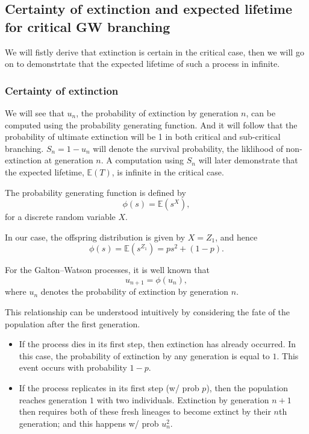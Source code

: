 \documentclass[11pt]{article}
\begin{document}
\subsection{Certainty of extinction and expected lifetime for critical GW branching}

We will fistly derive that extinction is certain in the critical case, then we will go on to demonstrtate that the
expected lifetime of such a process in infinite. 







\subsubsection{Certainty of extinction}


We will see that $u_n$, the probability of extinction by generation $n$, can be computed
using the probability generating function. And it will follow that the probability of ultimate 
extinction will be 1 in both critical and sub-critical branching. $S_n = 1-u_n$ will denote the survival probability,
the liklihood of non-extinction at generation $n$. A computation using $S_n$ will later demonstrate that the expected lifetime, $\mathbb{E}(T)$, is infinite in the critical case.

\vspace{12pt}


\noindent
The probability generating function is defined by
\[
\phi(s) = \mathbb{E}(s^{X}),
\]
for a discrete random variable $X$.

In our case, the offspring distribution is given by $X = Z_1$, and hence
\[
\phi(s) = \mathbb{E}(s^{Z_1}) = p s^2 + (1-p).
\]


\noindent
For the Galton--Watson processes, it is well known that
\[
u_{n+1} = \phi(u_n),
\]
where $u_n$ denotes the probability of extinction by generation $n$.

This relationship can be understood intuitively by considering the fate of the
population after the first generation.

\begin{itemize}
    \item If the process dies in its first step, then extinction has already
    occurred. In this case, the probability of extinction by any generation is
    equal to $1$. This event occurs with probability $1-p$.
    \item If the process replicates in its first step (w/ prob $p$), then the population
    reaches generation $1$ with two individuals. Extinction by generation $n+1$
    then requires both of these fresh lineages to become extinct by their $n$th generation; and this happens w/ prob $u_n^2$.
\end{itemize}
\end{document}
